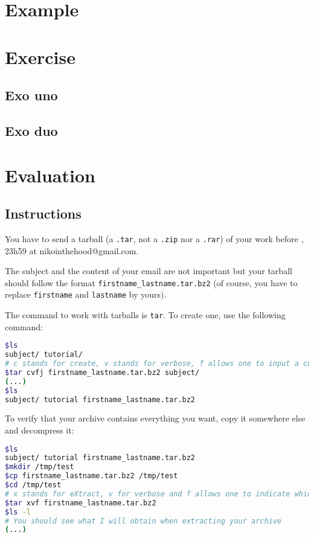\documentclass[12pt]{article}
\begin{document}
\section{Example}

\section{Exercise}
\subsection{Exo uno}
\subsection{Exo duo}

\section{Evaluation}
\subsection{Instructions}

You have to send a tarball (a \texttt{.tar}, not a \texttt{.zip} nor a \texttt{.rar}) of your work before , 23h59 at nikointhehood@gmail.com.

The subject and the content of your email are not important but your tarball should follow the format \texttt{firstname\_lastname.tar.bz2} (of course, you have to replace \texttt{firstname} and \texttt{lastname} by yours).

The command to work with tarballs is \texttt{tar}. To create one, use the following command:

\begin{lstlisting}[language=bash]
$ls
subject/ tutorial/
# c stands for create, v stands for verbose, f allows one to input a custom name for the archive and j indicates the usage of bzip2
$tar cvfj firstname_lastname.tar.bz2 subject/
(...)
$ls
subject/ tutorial firstname_lastname.tar.bz2
\end{lstlisting}

To verify that your archive contains everything you want, copy it somewhere else and decompress it:

\begin{lstlisting}[language=bash]
$ls
subject/ tutorial firstname_lastname.tar.bz2
$mkdir /tmp/test
$cp firstname_lastname.tar.bz2 /tmp/test
$cd /tmp/test
# x stands for eXtract, v for verbose and f allows one to indicate which file tar should work with
$tar xvf firstname_lastname.tar.bz2
$ls -l
# You should see what I will obtain when extracting your archive
(...)
\end{lstlisting}
\end{document}
